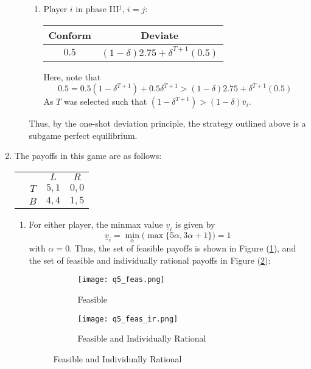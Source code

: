 \documentclass[11pt]{article}
\begin{document}
\begin{enumerate}
\begin{enumerate}
\begin{enumerate}[label = \roman{*})]
			\item Player $ i $ in phase III$ ^j $, $ i = j $:
			\begin{table}[!h]
				\centering
				\begin{tabular}{c|c}
					Conform & Deviate \\ \hline
					$ 0.5 $ & $ (1 - \delta)2.75 + \delta^{T+1}(0.5) $
				\end{tabular}
			\end{table}
		
		Here, note that
		\[0.5 = 0.5(1 - \delta^{T+1}) + 0.5\delta^{T+1} > (1 - \delta)2.75 + \delta^{T+1}(0.5) \]
		As $ T $ was selected such that $ (1 - \delta^{T + 1}) > (1 - \delta)\bar{v}_i $. 
			
		\end{enumerate}
		Thus, by the one-shot deviation principle, the strategy outlined above is a subgame perfect equilibrium. 
	\end{enumerate}
	
	\item The payoffs in this game are as follows: 
	\begin{table}[!htbp]
		\centering
		\setlength{\extrarowheight}{2pt}
		\begin{tabular}{cc|c|c|}
			& \multicolumn{1}{c}{} & \multicolumn{1}{c}{$L$}  & \multicolumn{1}{c}{$R$} \\\cline{3-4}
			& $T$ & $ 5,1 $ & $ 0,0 $ \\\cline{3-4}
			& $B$ & $ 4,4 $ & $ 1,5 $ \\\cline{3-4}
		\end{tabular}
	\end{table}

	\begin{enumerate}
		\item For either player, the minmax value $ \underline{v}_i $ is given by
		\[\underline{v}_i = \min_\alpha\big(\max\{5\alpha, 3\alpha + 1\}\big) = 1\]
		with $\alpha = 0$. Thus, the set of feasible payoffs is shown in Figure (\ref{fig2_a}), and the set of feasible and individually rational payoffs in Figure (\ref{fig2_b}):
		\begin{figure}[!hbtp]
			\caption{}
			\begin{subfigure}{.5\textwidth}
				\centering
				\texttt{[image: q5\_feas.png]}
				\caption{Feasible}
				\label{fig2_a}
			\end{subfigure}%
			\begin{subfigure}{.5\textwidth}
				\centering
				\texttt{[image: q5\_feas\_ir.png]}
				\caption{Feasible and Individually Rational}
				\label{fig2_b}
			\end{subfigure}
			\label{fig2}
		\end{figure}
		

\end{enumerate}
\end{enumerate}
\end{document}
